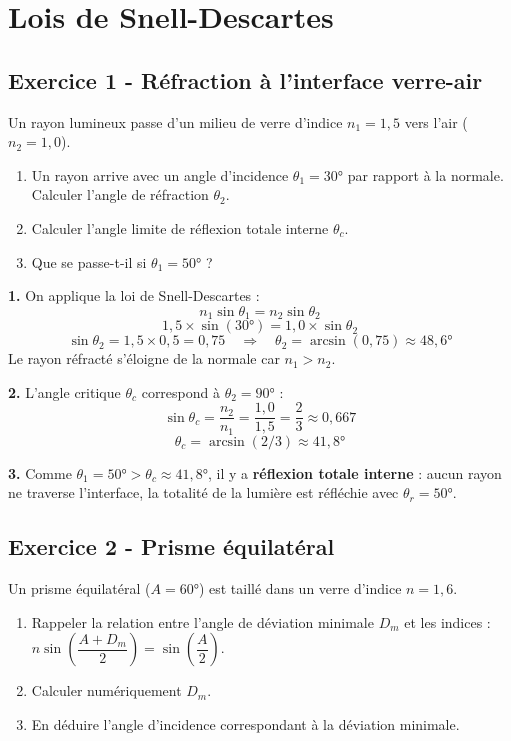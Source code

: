 \documentclass[12pt,a4paper]{article}
\begin{document}
\newpage
\section{Lois de Snell-Descartes}

\subsection*{Exercice 1 - Réfraction à l'interface verre-air \niveau{\facile}}

\begin{boiteexercice}
Un rayon lumineux passe d'un milieu de verre d'indice $n_1 = 1{,}5$ vers l'air ($n_2 = 1{,}0$).
\begin{enumerate}
  \item Un rayon arrive avec un angle d'incidence $\theta_1 = 30°$ par rapport à la normale. Calculer l'angle de réfraction $\theta_2$.
  \item Calculer l'angle limite de réflexion totale interne $\theta_c$.
  \item Que se passe-t-il si $\theta_1 = 50°$ ?
\end{enumerate}
\end{boiteexercice}

\begin{boitecorrige}
\textbf{1.} On applique la loi de Snell-Descartes :
\[
n_1\sin\theta_1 = n_2\sin\theta_2
\]
\[
1{,}5 \times \sin(30°) = 1{,}0 \times \sin\theta_2
\]
\[
\sin\theta_2 = 1{,}5 \times 0{,}5 = 0{,}75 \quad \Rightarrow \quad \theta_2 = \arcsin(0{,}75) \approx 48{,}6°
\]
Le rayon réfracté s'éloigne de la normale car $n_1 > n_2$.

\textbf{2.} L'angle critique $\theta_c$ correspond à $\theta_2 = 90°$ :
\[
\sin\theta_c = \frac{n_2}{n_1} = \frac{1{,}0}{1{,}5} = \frac{2}{3} \approx 0{,}667
\]
\[
\theta_c = \arcsin(2/3) \approx 41{,}8°
\]

\textbf{3.} Comme $\theta_1 = 50° > \theta_c \approx 41{,}8°$, il y a \textbf{réflexion totale interne} : aucun rayon ne traverse l'interface, la totalité de la lumière est réfléchie avec $\theta_r = 50°$.
\end{boitecorrige}

\subsection*{Exercice 2 - Prisme équilatéral \niveau{\moyen}}

\begin{boiteexercice}
Un prisme équilatéral ($A = 60°$) est taillé dans un verre d'indice $n = 1{,}6$.
\begin{enumerate}
  \item Rappeler la relation entre l'angle de déviation minimale $D_m$ et les indices : $n\sin\!\left(\dfrac{A+D_m}{2}\right) = \sin\!\left(\dfrac{A}{2}\right)$.
  \item Calculer numériquement $D_m$.
  \item En déduire l'angle d'incidence correspondant à la déviation minimale.
\end{enumerate}
\end{boiteexercice}
\end{document}
